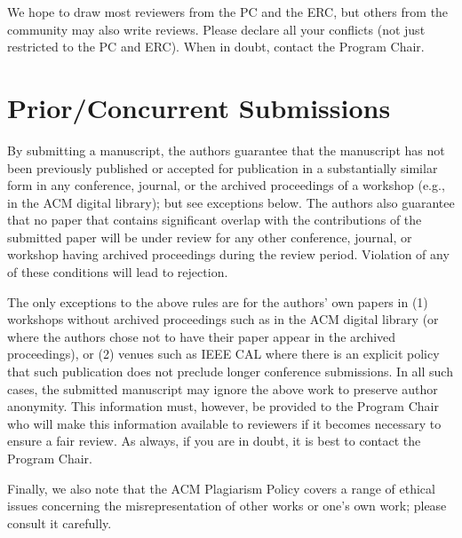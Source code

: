 \documentclass{sig-alternate}
\begin{document}
We hope to draw most reviewers from the PC and the ERC, but others from the community may also write reviews. Please declare all your conflicts (not just restricted to the PC and ERC). When in doubt, contact the Program Chair.

\section{Prior/Concurrent Submissions}

By submitting a manuscript, the authors guarantee that the manuscript has not been previously published or accepted for publication in a substantially similar form in any conference, journal, or the archived proceedings of a workshop (e.g., in the ACM digital library); but see exceptions below. The authors also guarantee that no paper that contains significant overlap with the contributions of the submitted paper will be under review for any other conference, journal, or workshop having archived proceedings during the review period. Violation of any of these conditions will lead to rejection.

The only exceptions to the above rules are for the authors' own papers in (1) workshops without archived proceedings such as in the ACM digital library (or where the authors chose not to have their paper appear in the archived proceedings), or (2) venues such as IEEE CAL where there is an explicit policy that such publication does not preclude longer conference submissions. In all such cases, the submitted manuscript may ignore the above work to preserve author anonymity. This information must, however, be provided to the Program Chair who  will make this information available to reviewers if it becomes necessary to ensure a fair review. As always, if you are in doubt, it is best to contact the Program Chair. 

Finally, we also note that the ACM Plagiarism Policy covers a range of ethical issues concerning the misrepresentation of other works or one's own work; please consult it carefully.




\end{document}
